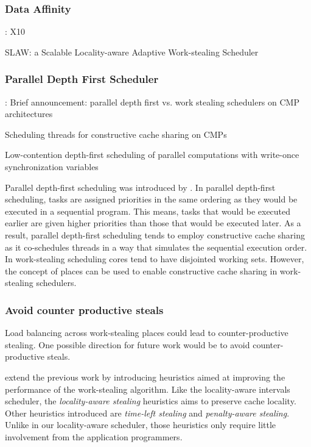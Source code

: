 \subsubsection{Data Affinity}

\textcite{Charles2005, Saraswat2010}: X10

\textcite{Guo2010} SLAW: a Scalable Locality-aware Adaptive
Work-stealing Scheduler

\subsubsection{Parallel Depth First Scheduler}

\textcite{Liaskovitis2006}: Brief announcement: parallel depth first
vs. work stealing schedulers on CMP architectures

\textcite{Chen2007} Scheduling threads for constructive cache sharing
on CMPs

\textcite{Fatourou2001} Low-contention depth-first scheduling of
parallel computations with write-once synchronization variables

Parallel depth-first scheduling was introduced by
\textcite{Blelloch1999}. In parallel depth-first scheduling, tasks are
assigned priorities in the same ordering as they would be executed in
a sequential program. This means, tasks that would be executed earlier
are given higher priorities than those that would be executed
later. As a result, parallel depth-first scheduling tends to employ
constructive cache sharing \cite{Liaskovitis2006, Chen2007} as it
co-schedules threads in a way that simulates the sequential execution
order. In work-stealing scheduling cores tend to have disjointed
working sets. However, the concept of places can be used to enable
constructive cache sharing in work-stealing schedulers.

\subsubsection{Avoid counter productive steals}

Load balancing across work-stealing places could lead to
counter-productive stealing. One possible direction for future work
would be to avoid counter-productive steals.

\textcite{Gaud2010} extend the previous work by introducing heuristics
aimed at improving the performance of the work-stealing
algorithm. Like the locality-aware intervals scheduler, the
\emph{locality-aware stealing} heuristics aims to preserve cache
locality. Other heuristics introduced are \emph{time-left stealing}
and \emph{penalty-aware stealing}. Unlike in our locality-aware
scheduler, those heuristics only require little involvement from the
application programmers.

